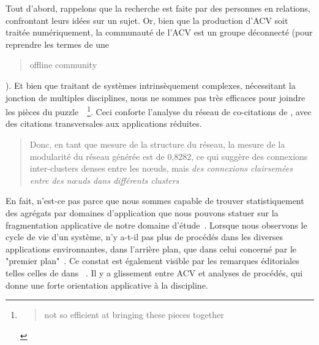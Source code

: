 Tout d'abord, rappelons que la recherche est faite par des personnes en relations, confrontant leurs idées sur un sujet.
Or, bien que la production d'ACV soit traitée numériquement, la communauté de l'ACV est un groupe déconnecté (pour reprendre les termes de \citeauthor{davis_industrial_2010} une \blockcquote{davis_industrial_2010}{offline community}).
Et bien que traitant de systèmes intrinsèquement complexes, nécessitant la jonction de multiples disciplines, nous ne sommes pas très efficaces pour joindre les pièces du puzzle~\cite{davis_industrial_2010}~\footnote{\blockcquote{davis_industrial_2010}{not so efficient at bringing these pieces together}}.
Ceci conforte l'analyse du réseau de co-citations de \citeauthor{chen_bibliometric_2014}, avec des citations transversales aux applications réduites.
\blockcquote[traduction]{chen_bibliometric_2014}{
Donc, en tant que mesure de la structure du réseau, la mesure de la modularité du réseau générée est de 0,8282, ce qui suggère des connexions inter-clusters denses entre les nœuds, mais \emph{des connexions clairsemées entre des nœuds dans différents clusters}
}.
% 
En fait, n'est-ce pas parce que nous sommes capable de trouver statistiquement des agrégats par domaines d'application que nous pouvons statuer sur la fragmentation applicative de notre domaine d'étude~.
Lorsque nous observons le cycle de vie d'un système, n'y a-t-il pas plus de procédés dans les diverses applications environnantes, dans l'arrière plan, que dans celui concerné par le "premier plan"~.
Ce constat est également visible par les remarques éditoriales telles celles de \citeauthor{klopffer_how_2014} dans ~\cite{klopffer_how_2014}.
Il y a glissement entre ACV et analyses de procédés, qui donne une forte orientation applicative à la discipline.

